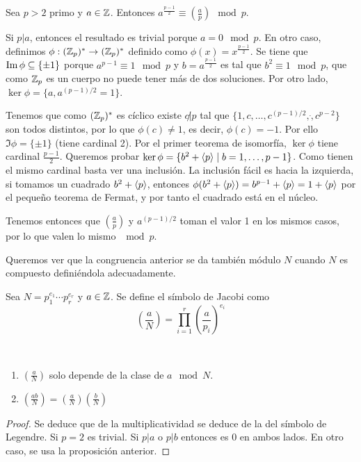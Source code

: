 \documentclass[CR.tex]{subfiles}
\begin{document}
\begin{prop}[Euler]
Sea $p>2$ primo y $a\in\mathbb{Z}$. Entonces $a^{\frac{p-1}{2}}\equiv (\frac{a}{p}) \mod p$.
\end{prop}
\begin{dem}
Si $p|a$, entonces el resultado es trivial porque $a=0\mod p$. En otro caso, definimos $\phi:(\mathbb{Z}_p)^*\to (\mathbb{Z}_p)^*$ definido como $\phi(x)=x^{\frac{p-1}{2}}$. Se tiene que $\operatorname{Im}\phi\subseteq \{\pm 1\}$ porque $a^{p-1}\equiv 1\mod p$ y $b=a^{\frac{p-1}{2}}$ es tal que $b^2\equiv 1\mod p$, que como $\mathbb{Z}_p$ es un cuerpo no puede tener más de dos soluciones. Por otro lado, $\ker\phi=\{a, a^{(p-1)/2}=1\}$. 

Tenemos que como $(\mathbb{Z}_p)^*$ es cíclico existe $c\not| p$ tal que $\{1,c,\dots, c^{(p-1)/2},\dot, c^{p-2}\}$ son todos distintos, por lo que $\phi(c)\neq 1$, es decir, $\phi(c)=-1$. Por ello $\Im\phi=\{\pm 1\}$ (tiene cardinal 2). Por el primer teorema de isomorfía, $\ker\phi$ tiene cardinal $\frac{p-1}{2}$.  Queremos probar $\ker\phi=\{b^2+\langle{p}\rangle\mid b=1,\dots, p-1\}$. Como tienen el mismo cardinal basta ver una inclusión. La inclusión fácil es hacia la izquierda, si tomamos un cuadrado $b^2+\langle{p}\rangle$, entonces $\phi(b^2+\langle{p}\rangle)=b^{p-1}+\langle{p}\rangle=1+\langle{p}\rangle$ por el pequeño teorema de Fermat, y por tanto el cuadrado está en el núcleo. 

Tenemos entonces que $(\frac{a}{p})$ y $a^{(p-1)/2}$ toman el valor 1 en los mismos casos, por lo que valen lo mismo $\mod p$. 
\end{dem}

Queremos ver que la congruencia anterior se da también módulo $N$ cuando $N$ es compuesto definiéndola adecuadamente. 

\begin{defi}
Sea $N=p_1^{e_1}\cdots p_r^{e_r}$ y $a\in\mathbb{Z}$. Se define el símbolo de Jacobi como 
\[
\left(\frac{a}{N}\right)=\prod_{i=1}^r \left(\frac{a}{p_i}\right)^{e_i}
\]
\end{defi}

\begin{lemma}\
\begin{enumerate}
\item $(\frac{a}{N})$ solo depende de la clase de $a\mod N$.
\item $(\frac{ab}{N})=(\frac{a}{N})(\frac{b}{N})$
\end{enumerate}
\end{lemma}
\begin{proof}
Se deduce que de la multiplicatividad se deduce de la del símbolo de Legendre. Si $p=2$ es trivial. Si $p|a$ o $p|b$ entonces es 0 en ambos lados. En otro caso, se usa la proposición anterior.
\end{proof}
\end{document}
